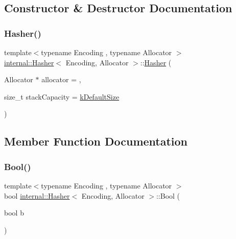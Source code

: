 \subsection{Constructor \& Destructor Documentation}
\mbox{\label{classinternal_1_1Hasher_a7b6abfdd3bdc60064a2322cdd20708c1}} 
\subsubsection{\texorpdfstring{Hasher()}{Hasher()}}
{\footnotesize\ttfamily template$<$typename Encoding , typename Allocator $>$ \\
\hyperlink{classinternal_1_1Hasher}{internal\+::\+Hasher}$<$ Encoding, Allocator $>$\+::\hyperlink{classinternal_1_1Hasher}{Hasher} (\begin{DoxyParamCaption}\item[{Allocator $\ast$}]{allocator = {},  }\item[{size\+\_\+t}]{stack\+Capacity = {\ttfamily \hyperlink{classinternal_1_1Hasher_a0a07e0306af8d4a3a87e88423c9e47a7}{k\+Default\+Size}} }\end{DoxyParamCaption})\hspace{0.3cm}{\ttfamily [inline]}}



\subsection{Member Function Documentation}
\mbox{\label{classinternal_1_1Hasher_a11efd784a4e9c4f8a3dc281552df0486}} 
\subsubsection{\texorpdfstring{Bool()}{Bool()}}
{\footnotesize\ttfamily template$<$typename Encoding , typename Allocator $>$ \\
bool \hyperlink{classinternal_1_1Hasher}{internal\+::\+Hasher}$<$ Encoding, Allocator $>$\+::Bool (\begin{DoxyParamCaption}\item[{bool}]{b }\end{DoxyParamCaption})\hspace{0.3cm}{\ttfamily [inline]}}

